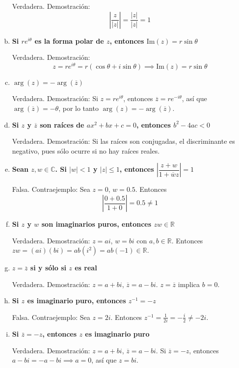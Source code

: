 \begin{prob}
\begin{myproof}
\begin{enumerate}[a)]
Verdadera.  
Demostración:  
\[
\left|\frac{z}{|z|}\right| = \frac{|z|}{|z|} = 1
\]

\item \textbf{Si $re^{i\theta}$ es la forma polar de $z$, entonces $\text{Im}(z)=r\sin \theta$}

Verdadera.  
Demostración:  
\[
z = re^{i\theta} = r(\cos\theta + i\sin\theta) \implies \text{Im}(z) = r\sin\theta
\]

\item \textbf{$\arg(z)=-\arg(\overline{z})$}

Verdadera.  
Demostración: Si $z = re^{i\theta}$, entonces $\overline{z} = re^{-i\theta}$, así que $\arg(\overline{z}) = -\theta$, por lo tanto $\arg(z) = -\arg(\overline{z})$.

\item \textbf{Si $z$ y $\overline{z}$ son raíces de $ax^2+bx+c=0$, entonces $b^2-4ac<0$}

Verdadera.  
Demostración: Si las raíces son conjugadas, el discriminante es negativo, pues sólo ocurre si no hay raíces reales.

\item \textbf{Sean $z, w\in \mathbb{C}$. Si $|w|<1$ y $|z|\leq 1$, entonces $\left|\dfrac{z+w}{1+\overline{w}z}\right|=1$}

Falsa.  
Contraejemplo: Sea $z=0$, $w=0.5$. Entonces
\[
\left|\frac{0+0.5}{1+0}\right| = 0.5 \neq 1
\]

\item \textbf{Si $z$ y $w$ son imaginarios puros, entonces $zw\in \mathbb{R}$}

Verdadera.  
Demostración: $z=ai$, $w=bi$ con $a,b\in\mathbb{R}$. Entonces $zw = (ai)(bi) = ab(i^2) = ab(-1) \in \mathbb{R}$.

\item \textbf{$z=\overline{z}$ si y sólo si $z$ es real}

Verdadera.  
Demostración: $z=a+bi$, $\overline{z}=a-bi$. $z=\overline{z}$ implica $b=0$.

\item \textbf{Si $z$ es imaginario puro, entonces $z^{-1}=-z$}

Falsa.  
Contraejemplo: Sea $z=2i$. Entonces $z^{-1} = \frac{1}{2i} = -\frac{i}{2} \neq -2i$.

\item \textbf{Si $\overline{z}=-z$, entonces $z$ es imaginario puro}

Verdadera.  
Demostración: $z=a+bi$, $\overline{z}=a-bi$. Si $\overline{z}=-z$, entonces $a-bi = -a-bi \implies a=0$, así que $z=bi$.


\end{enumerate}
\end{myproof}
\end{prob}
